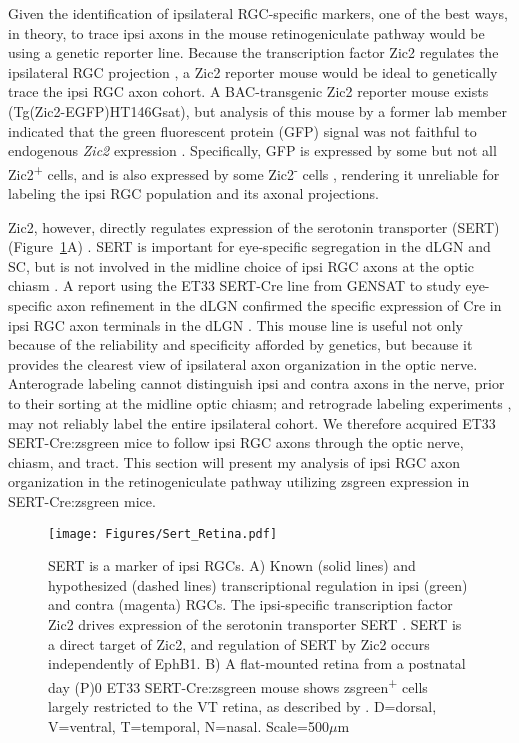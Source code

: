 \label{sec:SertCreResults}
Given the identification of ipsilateral RGC-specific markers, one of the best ways, in theory, to trace ipsi axons in the mouse retinogeniculate pathway would be using a genetic reporter line.
Because the transcription factor Zic2 regulates the ipsilateral RGC projection \cite{herrera2003zic2,williams2003ephrin}, a Zic2 reporter mouse would be ideal to genetically trace the ipsi RGC axon cohort.
A BAC-transgenic Zic2 reporter mouse exists (Tg(Zic2-EGFP)HT146Gsat), but analysis of this mouse by a former lab member indicated that the green fluorescent protein (GFP) signal was not faithful to endogenous \emph{Zic2} expression \cite{wang2013neuronal}.
Specifically, GFP is expressed by some but not all Zic2\textsuperscript{+} cells, and is also expressed by some Zic2\textsuperscript{-} cells \cite{wang2013neuronal}, rendering it unreliable for labeling the ipsi RGC population and its axonal projections.

Zic2, however, directly regulates expression of the serotonin transporter (SERT) (Figure~\ref{Figures/Sert_Retina}A) \cite{garcia2010zic2}.
SERT is important for eye-specific segregation in the dLGN and SC, but is not involved in the midline choice of ipsi RGC axons at the optic chiasm \cite{salichon2001excessive,upton1999excess,garcia2010zic2}.
A report using the ET33 SERT-Cre line from GENSAT to study eye-specific axon refinement in the dLGN confirmed the specific expression of Cre in ipsi RGC axon terminals in the dLGN \cite{koch2011pathway}.
This mouse line is useful not only because of the reliability and specificity afforded by genetics, but because it provides the clearest view of ipsilateral axon organization in the optic nerve.
Anterograde labeling cannot distinguish ipsi and contra axons in the nerve, prior to their sorting at the midline optic chiasm; and retrograde labeling experiments \cite{colello1990early}, may not reliably label the entire ipsilateral cohort.
We therefore acquired ET33 SERT-Cre:zsgreen mice to follow ipsi RGC axons through the optic nerve, chiasm, and tract.
This section will present my analysis of ipsi RGC axon organization in the retinogeniculate pathway utilizing zsgreen expression in SERT-Cre:zsgreen mice.

\begin{figure}[hbtp]
	\begin{center}
		\texttt{[image: Figures/Sert\_Retina.pdf]}
		\caption[SERT is a marker of ipsi RGCs.]
		{SERT is a marker of ipsi RGCs. 
		A) Known (solid lines) and hypothesized (dashed lines) transcriptional regulation in ipsi (green) and contra (magenta) RGCs.
		The ipsi-specific transcription factor Zic2 drives expression of the serotonin transporter SERT \cite{garcia2010zic2}.
		SERT is a direct target of Zic2, and regulation of SERT by Zic2 occurs independently of EphB1.
		B) A flat-mounted retina from a postnatal day (P)0 ET33 SERT-Cre:zsgreen mouse shows zsgreen\textsuperscript{+} cells largely restricted to the VT retina, as described by . 
		D=dorsal, V=ventral, T=temporal, N=nasal. 
		Scale=500$\mu$m}
		\label{Figures/Sert_Retina}
	\end{center}
\end{figure}

